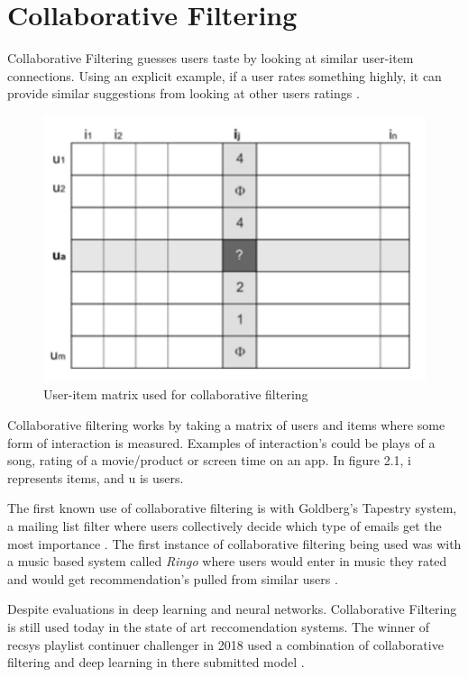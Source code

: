 \section{Collaborative Filtering}

Collaborative Filtering guesses users taste by looking at similar user-item connections. Using an explicit example, if a user rates something highly, it can provide similar suggestions from looking at other users ratings \citep{celma_recommendation_2010}.

\begin{figure}[H]
	\includegraphics[scale=0.65]{images/collaborative_filtering}
	\centering
	\caption{User-item matrix used for collaborative filtering \citep{celma_recommendation_2010}} 
	\label{fig:figure}
\end{figure}

Collaborative filtering works by taking a matrix of users and items where some form of interaction is measured. Examples of interaction's could be plays of a song, rating of a movie/product or screen time on an app. In figure 2.1, i represents items, and u is users.

The first known use of collaborative filtering is with Goldberg's Tapestry system, a mailing list filter where users collectively decide which type of emails get the most importance \citep{goldberg_using_1992}. The first instance of collaborative filtering being used was with a music based system called \textit{Ringo} where users would enter in music they rated and would get recommendation's pulled from similar users \citep{shardanand_social_1995}. 

Despite evaluations in deep learning and neural networks. Collaborative Filtering is still used today in the state of art reccomendation systems. The winner of recsys playlist continuer challenger in 2018 used a combination of collaborative filtering and deep learning in there submitted model \citep{volkovs_two-stage_2018}.

